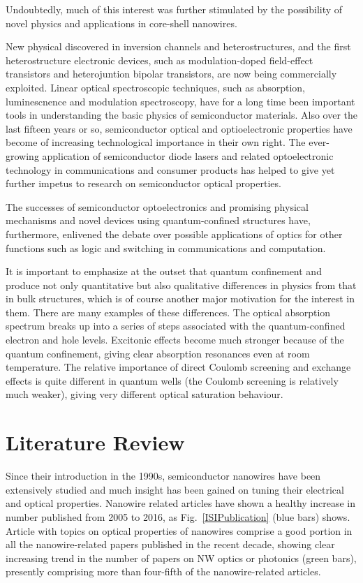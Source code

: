 Undoubtedly, much of this interest was further stimulated by the possibility of
novel physics and applications in core-shell nanowires. 

New physical discovered in inversion channels and
heterostructures, and the first heterostructure electronic devices, such as
modulation-doped field-effect transistors and heterojuntion bipolar
transistors, are now being commercially exploited. Linear optical spectroscopic
techniques, such as absorption, luminescnence and modulation spectroscopy, have
for a long time been important tools in understanding the basic physics of
semiconductor materials. Also over the last fifteen years or so, semiconductor
optical and optioelectronic properties have become of increasing technological
importance in their own right. The ever-growing application of semiconductor
diode lasers and related optoelectronic technology in communications and
consumer products has helped to give yet further impetus to research on
semiconductor optical properties. 

The successes of semiconductor optoelectronics and promising physical
mechanisms and novel devices using quantum-confined structures have,
furthermore, enlivened the debate over possible applications of optics for
other functions such as logic and switching in communications and computation.

It is important to emphasize at the outset that quantum confinement and produce
not only quantitative but also qualitative differences in physics from that in
bulk structures, which is of course another major motivation for the interest
in them. There are many examples of these differences. The optical absorption
spectrum breaks up into a series of steps associated with the quantum-confined
electron and hole levels. Excitonic effects become much stronger because of the
quantum confinement, giving clear absorption resonances even at room
temperature. The relative importance of direct Coulomb screening and exchange
effects is quite different in quantum wells (the Coulomb screening is
relatively much weaker), giving very different optical saturation behaviour.


\section{Literature Review} \label{sec:intro_LR}

Since their introduction in the 1990s, semiconductor nanowires have been
extensively studied and much insight has been gained on tuning their electrical
and optical properties. Nanowire related articles have shown a healthy
increase in number published from 2005 to 2016, as Fig.~\ref{ISIPublication}
(blue bars) shows. Article with topics on optical properties of nanowires
comprise a good portion in all the nanowire-related papers published in the
recent decade, showing clear increasing trend in the number of papers on NW
optics or photonics (green bars), presently comprising more than four-fifth of
the nanowire-related articles.

